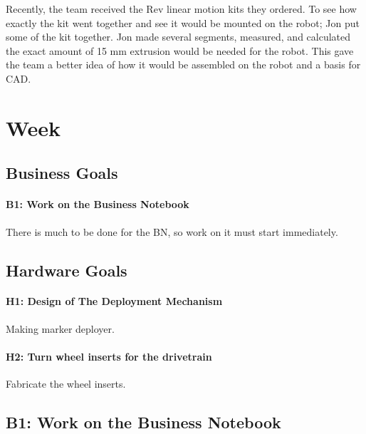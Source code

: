 \documentclass{article}
\begin{document}
Recently, the team received the Rev linear motion kits they ordered. To see how exactly the kit went together and see it would be mounted on the robot; Jon put some of the kit together. Jon made several segments, measured, and calculated the exact amount of 15 mm extrusion would be needed for the robot. This gave the team a better idea of how it would be assembled on the robot and a basis for CAD.
\clearpage \newpage \section{Week \thesection} 
\subsection{Business Goals}
\paragraph{B1: Work on the Business Notebook}
 There is much to be done for the BN, so work on it must start immediately.
\subsection{Hardware Goals}
\paragraph{H1: Design of The Deployment Mechanism}
 Making marker deployer.
\paragraph{H2: Turn wheel inserts for the drivetrain}
 Fabricate the wheel inserts.
\newpage
\subsection{B1: Work on the Business Notebook}
\end{document}
